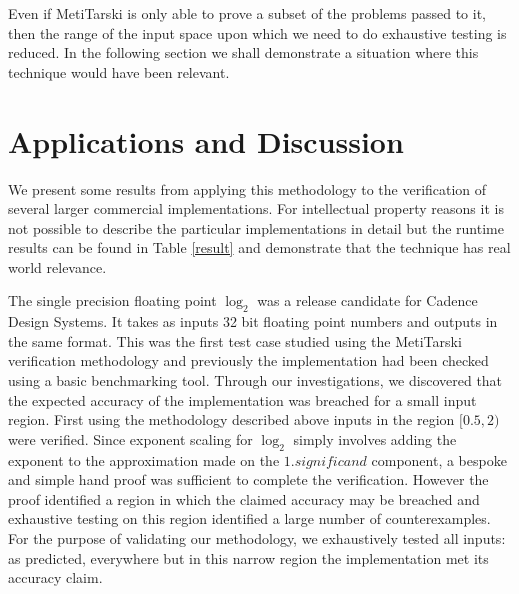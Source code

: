 Even if MetiTarski is only able to prove a subset of the problems passed to it, then the range of the input space upon which we need to do exhaustive testing is reduced. In the following section we shall demonstrate a situation where this technique would have been relevant. 

\section{Applications and Discussion}
\label{Apps}
We present some results from applying this methodology to the verification of several larger commercial implementations. For intellectual property reasons it is not possible to describe the particular implementations in detail but the runtime results can be found in Table \ref{result} and demonstrate that the technique has real world relevance. 

The single precision floating point $\log_2$ was a release candidate for Cadence Design Systems. It takes as inputs 32 bit floating point numbers and outputs in the same format. This was the first test case studied using the MetiTarski verification methodology and previously the implementation had been checked using a basic benchmarking tool. Through our investigations, we discovered that the expected accuracy of the implementation was breached for a small input region. First using the methodology described above inputs in the region $[0.5,2)$ were verified. Since exponent scaling for $\log_2$ simply involves adding the exponent to the approximation made on the $1.\textit{significand}$ component, a bespoke and simple hand proof was sufficient to complete the verification. However the proof identified a region in which the  claimed accuracy may be breached and exhaustive testing on this region identified a large number of counterexamples. For the purpose of validating our methodology, we exhaustively tested all inputs: as predicted, everywhere but in this narrow region the implementation met its accuracy claim.

